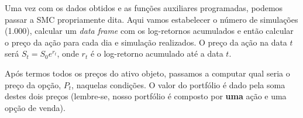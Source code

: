 \documentclass[]{book}
\newenvironment{Shaded}{\begin{snugshade}}{\end{snugshade}}
\newcommand{\CommentTok}[1]{\textcolor[rgb]{0.56,0.35,0.01}{\textit{#1}}}
\newcommand{\DataTypeTok}[1]{\textcolor[rgb]{0.13,0.29,0.53}{#1}}
\newcommand{\DecValTok}[1]{\textcolor[rgb]{0.00,0.00,0.81}{#1}}
\newcommand{\KeywordTok}[1]{\textcolor[rgb]{0.13,0.29,0.53}{\textbf{#1}}}
\newcommand{\NormalTok}[1]{#1}
\newcommand{\OperatorTok}[1]{\textcolor[rgb]{0.81,0.36,0.00}{\textbf{#1}}}
\newcommand{\StringTok}[1]{\textcolor[rgb]{0.31,0.60,0.02}{#1}}
\theoremstyle{definition}
\theoremstyle{definition}
\theoremstyle{definition}
\theoremstyle{remark}
\begin{document}
Uma vez com os dados obtidos e as funções auxiliares programadas, podemos passar a SMC propriamente dita. Aqui vamos estabelecer o número de simulações (1.000), calcular um \emph{data frame} com os log-retornos acumulados e então calcular o preço da ação para cada dia e simulação realizados. O preço da ação na data \(t\) será \(S_t=S_0 e^{r_t}\), onde \(r_t\) é o log-retorno acumulado até a data \(t\).

Após termos todos os preços do ativo objeto, passamos a computar qual seria o preço da opção, \(P_t\), naquelas condições. O valor do portfólio é dado pela soma destes dois preços (lembre-se, nosso portfólio é composto por \textbf{uma} ação e uma opção de venda).

\begin{Shaded}
\end{Shaded}
\end{document}
